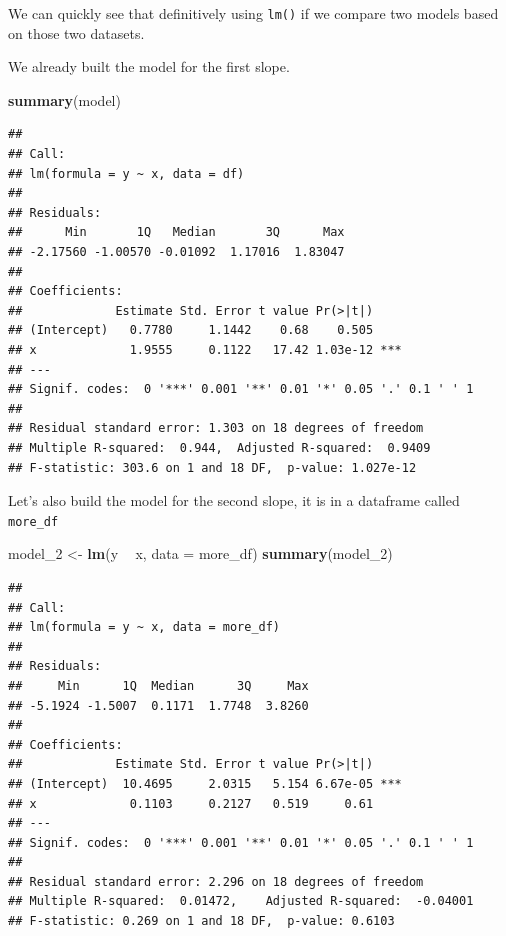 \documentclass[
]{book}
\newenvironment{Shaded}{\begin{snugshade}}{\end{snugshade}}
\newcommand{\DataTypeTok}[1]{\textcolor[rgb]{0.13,0.29,0.53}{#1}}
\newcommand{\DecValTok}[1]{\textcolor[rgb]{0.00,0.00,0.81}{#1}}
\newcommand{\KeywordTok}[1]{\textcolor[rgb]{0.13,0.29,0.53}{\textbf{#1}}}
\newcommand{\NormalTok}[1]{#1}
\newcommand{\OperatorTok}[1]{\textcolor[rgb]{0.81,0.36,0.00}{\textbf{#1}}}
\newcommand{\StringTok}[1]{\textcolor[rgb]{0.31,0.60,0.02}{#1}}
\begin{document}
We can quickly see that definitively using \texttt{lm()} if we compare two models based on those two datasets.

We already built the model for the first slope.

\begin{Shaded}
\begin{Highlighting}[]
\KeywordTok{summary}\NormalTok{(model)}
\end{Highlighting}
\end{Shaded}

\begin{verbatim}
## 
## Call:
## lm(formula = y ~ x, data = df)
## 
## Residuals:
##      Min       1Q   Median       3Q      Max 
## -2.17560 -1.00570 -0.01092  1.17016  1.83047 
## 
## Coefficients:
##             Estimate Std. Error t value Pr(>|t|)    
## (Intercept)   0.7780     1.1442    0.68    0.505    
## x             1.9555     0.1122   17.42 1.03e-12 ***
## ---
## Signif. codes:  0 '***' 0.001 '**' 0.01 '*' 0.05 '.' 0.1 ' ' 1
## 
## Residual standard error: 1.303 on 18 degrees of freedom
## Multiple R-squared:  0.944,	Adjusted R-squared:  0.9409 
## F-statistic: 303.6 on 1 and 18 DF,  p-value: 1.027e-12
\end{verbatim}

Let's also build the model for the second slope, it is in a dataframe called \texttt{more\_df}

\begin{Shaded}
\begin{Highlighting}[]
\NormalTok{model_}\DecValTok{2}\NormalTok{ <-}\StringTok{ }\KeywordTok{lm}\NormalTok{(y }\OperatorTok{~}\StringTok{ }\NormalTok{x, }\DataTypeTok{data =}\NormalTok{ more_df)}
\KeywordTok{summary}\NormalTok{(model_}\DecValTok{2}\NormalTok{)}
\end{Highlighting}
\end{Shaded}

\begin{verbatim}
## 
## Call:
## lm(formula = y ~ x, data = more_df)
## 
## Residuals:
##     Min      1Q  Median      3Q     Max 
## -5.1924 -1.5007  0.1171  1.7748  3.8260 
## 
## Coefficients:
##             Estimate Std. Error t value Pr(>|t|)    
## (Intercept)  10.4695     2.0315   5.154 6.67e-05 ***
## x             0.1103     0.2127   0.519     0.61    
## ---
## Signif. codes:  0 '***' 0.001 '**' 0.01 '*' 0.05 '.' 0.1 ' ' 1
## 
## Residual standard error: 2.296 on 18 degrees of freedom
## Multiple R-squared:  0.01472,	Adjusted R-squared:  -0.04001 
## F-statistic: 0.269 on 1 and 18 DF,  p-value: 0.6103
\end{verbatim}
\end{document}
